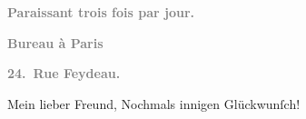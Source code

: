 \pstart
           \begin{otherlanguage}{french}\textcolor{gray}{\textbf{\textbf{Paraissant trois fois par jour.}}}\end{otherlanguage}\pend
           
\pstart
           \begin{otherlanguage}{french}\textcolor{gray}{\textbf{\textbf{Bureau à Paris}}}\end{otherlanguage}\pend
           
\pstart
           \begin{otherlanguage}{french}\textcolor{gray}{\textbf{\textbf{24. Rue Feydeau.}}}\end{otherlanguage}\pend
           
\pstart\center{}Mein lieber Freund,\pend\vspace{0.5em}
\pstart
           Nochmals innigen Glückwunſch!\pend
           
